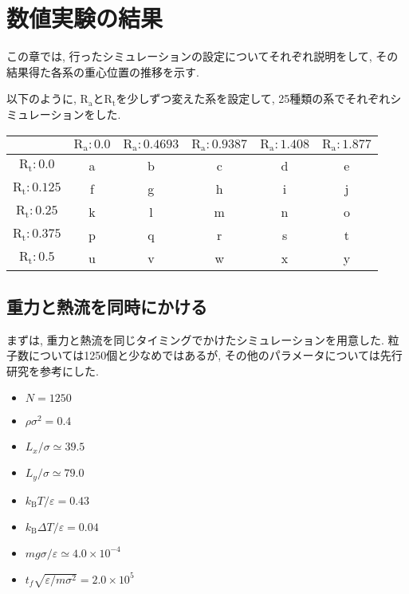 \chapter{数値実験の結果}\label{chap:simulation}

この章では, 行ったシミュレーションの設定についてそれぞれ説明をして, その結果得た各系の重心位置の推移を示す.

以下のように, $\text{R}_\text{a}$と$\text{R}_\text{t}$を少しずつ変えた系を設定して, 25種類の系でそれぞれシミュレーションをした.

\vspace{1\baselineskip}

\begin{center}
\begin{tabular}{|c|c|c|c|c|c|} \hline
        & $\text{R}_\text{a}:0.0$ & $\text{R}_\text{a}:0.4693$ & $\text{R}_\text{a}:0.9387$ & $\text{R}_\text{a}:1.408$ & $\text{R}_\text{a}:1.877$ \\ \hline
  $\text{R}_\text{t}:0.0$ & a      & b      & c      & d      & e     \\ \hline
  $\text{R}_\text{t}:0.125$ & f      & g      & h      & i      & j     \\ \hline
  $\text{R}_\text{t}:0.25$ & k      & l      & m      & n      & o     \\ \hline
  $\text{R}_\text{t}:0.375$ & p      & q      & r      & s      & t     \\ \hline
  $\text{R}_\text{t}:0.5$ & u      & v      & w      & x      & y     \\ \hline
\end{tabular}
\end{center}

\section{重力と熱流を同時にかける}\label{sec:RaRtmap}

\vspace{1\baselineskip}

まずは, 重力と熱流を同じタイミングでかけたシミュレーションを用意した. 粒子数については1250個と少なめではあるが, その他のパラメータについては先行研究\cite{Yoshida}を参考にした. 

\begin{itemize}
  \item $N = 1250$
  \item $\rho {\sigma}^2 = 0.4$
  \item $L_x / \sigma \simeq 39.5$
  \item $L_y / \sigma \simeq 79.0$
  \item $k_{\text{B}} T / \varepsilon = 0.43$
  \item $k_{\text{B}} \Delta T / \varepsilon = 0.04$
  \item $mg\sigma/\varepsilon \simeq 4.0 \times 10^{-4}$
  \item $t_f \sqrt{\varepsilon / m \sigma^2} = 2.0 \times 10^{5}$
\end{itemize}

